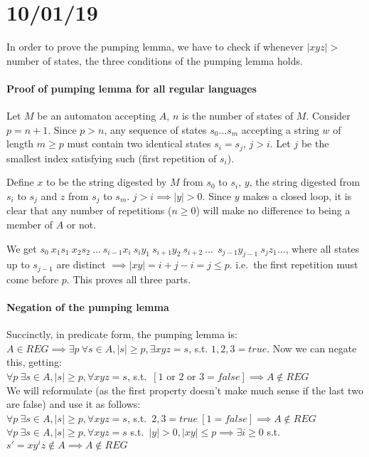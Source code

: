\documentclass[12 pt]{article}
\begin{document}
\section{10/01/19}
In order to prove the pumping lemma, we have to check if whenever
$|xyz| > $ number of states, the three conditions of the pumping lemma
holds.
\paragraph{Proof of pumping lemma for all regular languages}
Let $M$ be an automaton accepting $A$, $n$ is the number of states of
$M$. Consider $p = n+1$. Since $p>n$, any sequence of states
$s_0\ldots s_m$ accepting a string $w$ of length $m \geq p$ must
contain two identical states $s_i = s_j$, $j > i$. Let $j$ be the
smallest index satisfying such (first repetition of $s_i$).

Define $x$ to be the string digested by $M$ from $s_0$ to $s_i$, $y$,
the string digested from $s_i$ to $s_j$ and $z$ from $s_j$ to
$s_m$. $j > i \implies |y| > 0$. Since $y$ makes a closed loop, it is
clear that any number of repetitions ($n \geq 0$) will make no
difference to being a member of $A$ or not.

We get $s_0\ x_1s_1\ x_2s_2\ \ldots\ s_{i-1}x_i\ s_iy_1\ s_{i+1}y_2\
s_{i+2}\ \ldots\ \ s_{j-1}y_{j-1}\ s_jz_1 \ldots$, where all states up to
$s_{j-1}$ are distinct $\implies |xy| = i + j - i = j \leq p$. i.e.\
the first repetition must come before $p$. This proves all three
parts.

\paragraph{Negation of the pumping lemma}
Succinctly, in predicate form, the pumping lemma is:\\
$A \in REG \implies \exists p\ \forall s \in A, |s| \geq p, \exists x
y z = s$, s.t. $1,2,3 = true$. Now we can negate this, getting:
\\ $\forall p\ \exists s \in A, |s| \geq p, \forall x y z = s$, s.t.\ $ [1
\text{ or } 2 \text{ or } 3 = false] \implies A \notin REG$
\\ We will reformulate (as the first property doesn't make much sense
if the last two are false) and use it as follows:
\\ $\forall p\ \exists s \in A, |s| \geq p, \forall x y z = s$, s.t.\
$2,3=true\ [1 = false] \implies A \notin REG$
\\ $\forall p \ \exists s \in A, |s| \geq p, \forall x y z = s$ s.t.\
$|y| > 0, |xy| \leq p \implies \exists i \geq 0$ s.t.\ $s' = xy^iz \notin
A \implies A \notin REG$
\end{document}

